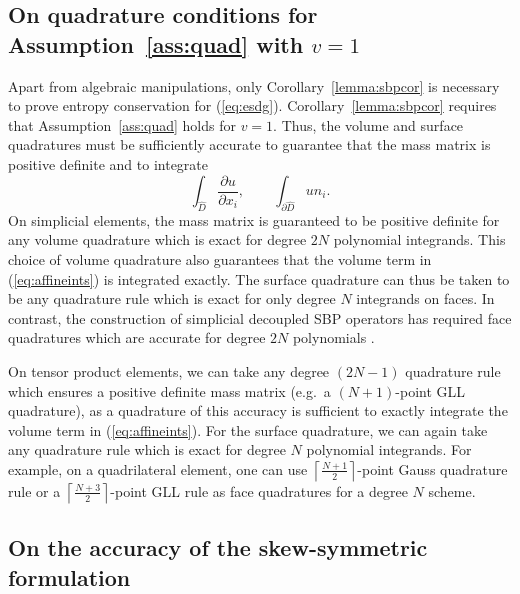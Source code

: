 \documentclass[review]{siamart0216}
\theoremstyle{assumption}
\renewcommand{\hat}[1]{\hat{#1}}
\newcommand{\pd}[2]{\frac{\partial#1}{\partial#2}}
\renewcommand{\hat}{\widehat}
\newcommand{\note}[1]{{\color{blue}{#1}}}
\begin{document}
\subsection{On quadrature conditions for Assumption~\ref{ass:quad} with $v = 1$}
\label{sec:assump1}
Apart from algebraic manipulations, only Corollary~\ref{lemma:sbpcor} is necessary to prove entropy conservation for (\ref{eq:esdg}).  Corollary~\ref{lemma:sbpcor} requires that Assumption~\ref{ass:quad} holds for $v=1$.  Thus, the volume and surface quadratures must be sufficiently accurate to guarantee that the mass matrix is positive definite and to integrate 
\begin{equation}
\int_{\hat{D}} \pd{u}{x_i}, \qquad \int_{\partial \hat{D}} u n_i. \label{eq:affineints}
\end{equation}
On simplicial elements, the mass matrix is guaranteed to be positive definite for any volume quadrature which is exact for degree $2N$ polynomial integrands.  This choice of volume quadrature also guarantees that the volume term in (\ref{eq:affineints}) is integrated exactly.  The surface quadrature can thus be taken to be any quadrature rule which is exact for only degree $N$ integrands on faces.  In contrast, the construction of simplicial decoupled SBP operators has required face quadratures which are accurate for degree $2N$ polynomials \cite{chan2017discretely, chan2018discretely}.  

On tensor product elements, we can take any degree $(2N-1)$ quadrature rule which ensures a positive definite mass matrix (e.g.\ a $(N+1)$-point GLL quadrature), as a quadrature of this accuracy is sufficient to exactly integrate the volume term in (\ref{eq:affineints}).  For the surface quadrature, we can again take any quadrature rule which is exact for degree $N$ polynomial integrands.  For example, on a quadrilateral element, one can use $\left\lceil\frac{N+1}{2}\right\rceil$-point Gauss quadrature rule or a $\left\lceil\frac{N+3}{2}\right\rceil$-point GLL rule as face quadratures for a degree $N$ scheme.  


\subsection{On the accuracy of the skew-symmetric formulation}
\end{document}
